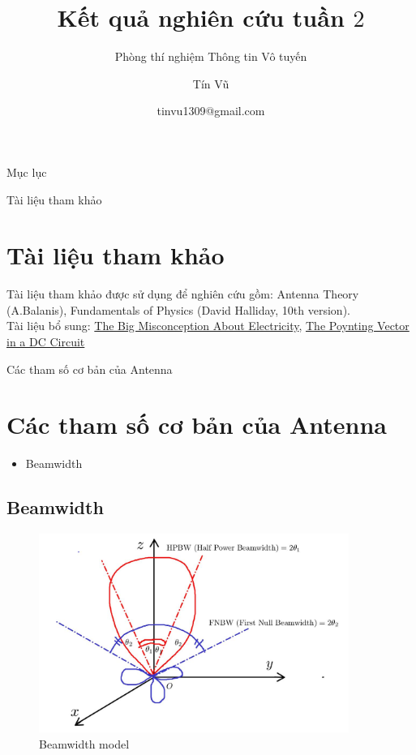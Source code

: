 \documentclass[8pt]{beamer}
\title[Kết quả nghiên cứu tuần 2]
{Kết quả nghiên cứu tuần $2$}
\subtitle{Phòng thí nghiệm Thông tin Vô tuyến}
\author[Phòng thí nghiệm thông tin Vô tuyến]
{Tín Vũ}
\date[VLC 2021] %
{tinvu1309@gmail.com}
\begin{document}
\frame{\titlepage}
\begin{frame}{Mục lục}
\tableofcontents
\end{frame}
\begin{frame}{Tài liệu tham khảo}
\section{Tài liệu tham khảo}
Tài liệu tham khảo được sử dụng để nghiên cứu gồm: Antenna Theory (A.Balanis), Fundamentals of Physics (David Halliday, 10th version).
\\ Tài liệu bổ sung: \href{https://www.youtube.com/watch?v=bHIhgxav9LY}{The Big Misconception About Electricity}, \href{https://www.youtube.com/watch?v=EH2A8mZmM9M}{The Poynting Vector in a DC Circuit}
\end{frame}
\begin{frame}{Các tham số cơ bản của Antenna}
\section{Các tham số cơ bản của Antenna}
\begin{itemize}
	\item Beamwidth
\end{itemize}
\subsection{Beamwidth}
\begin{figure}[h]
			\includegraphics[width=0.9\textwidth]{beamwidth.jpg}
			\caption{Beamwidth model}			\label{fig:re1}
\end{figure}
\end{frame}
\end{document}
